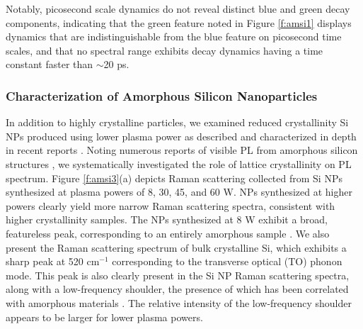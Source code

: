 Notably, picosecond scale dynamics do not reveal distinct blue and green decay components, indicating that the green feature noted in Figure \ref{f:amsi1} displays dynamics that are indistinguishable from the blue feature on picosecond time scales, and that no spectral range exhibits decay dynamics having a time constant faster than $\sim$20 ps.

\subsubsection{Characterization of Amorphous Silicon Nanoparticles}
In addition to highly crystalline particles, we examined reduced crystallinity Si NPs produced using lower plasma power as described and characterized in depth in recent reports \cite{PhysRevB.80.115407,anthony2011routes}. Noting numerous reports of visible PL from amorphous silicon structures \cite{pankove1977PL, wang2003high,wehrspohn1997electrochemistry}, we systematically investigated the role of lattice crystallinity on PL spectrum. Figure \ref{f:amsi3}(a) depicts Raman scattering collected from Si NPs synthesized at plasma powers of 8, 30, 45, and 60 W. NPs synthesized at higher powers clearly yield more narrow Raman scattering spectra, consistent with higher crystallinity samples. The NPs synthesized at 8 W exhibit a broad, featureless peak, corresponding to an entirely amorphous sample \cite{PhysRevB.80.115407}. We also present the Raman scattering spectrum of bulk crystalline Si, which exhibits a sharp peak at 520 cm$^{-1}$ corresponding to the transverse optical (TO) phonon mode. This peak is also clearly present in the Si NP Raman scattering spectra, along with a low-frequency shoulder, the presence of which has been correlated with amorphous materials \cite{duan2012raman}. The relative intensity of the low-frequency shoulder appears to be larger for lower plasma powers.

